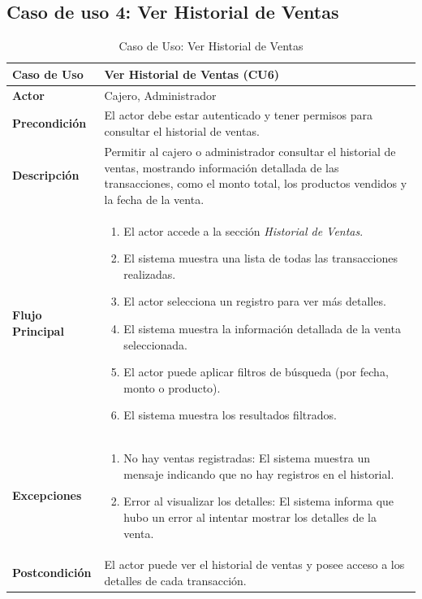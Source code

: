 \documentclass{article}
\begin{document}
\subsection{Caso de uso 4: Ver Historial de Ventas}

\begin{table}[H]
    \centering
    \begin{tabular}{|p{3.5cm}|p{10cm}|}
    \hline
    \textbf{Caso de Uso}   & Ver Historial de Ventas (CU6) \\ \hline
    \textbf{Actor}         & Cajero, Administrador \\ \hline
    \textbf{Precondición}  & 
    El actor debe estar autenticado y tener permisos para consultar el historial de ventas. \\ \hline
    \textbf{Descripción}   & 
    Permitir al cajero o administrador consultar el historial de ventas, mostrando información detallada de las transacciones, como el monto total, los productos vendidos y la fecha de la venta. \\ \hline
    \textbf{Flujo Principal} & 
    \begin{enumerate}
        \item El actor accede a la sección \textit{Historial de Ventas}.
        \item El sistema muestra una lista de todas las transacciones realizadas.
        \item El actor selecciona un registro para ver más detalles.
        \item El sistema muestra la información detallada de la venta seleccionada.
        \item El actor puede aplicar filtros de búsqueda (por fecha, monto o producto).
        \item El sistema muestra los resultados filtrados.
    \end{enumerate} \\ \hline
    \textbf{Excepciones}   & 
    \begin{enumerate}
        \item No hay ventas registradas: El sistema muestra un mensaje indicando que no hay registros en el historial.
        \item Error al visualizar los detalles: El sistema informa que hubo un error al intentar mostrar los detalles de la venta.
    \end{enumerate} \\ \hline
    \textbf{Postcondición} & 
    El actor puede ver el historial de ventas y posee acceso a los detalles de cada transacción. \\ \hline
    \end{tabular}
    \caption{Caso de Uso: Ver Historial de Ventas}
    \label{tab:cu6}
\end{table}        
    
\end{document}

